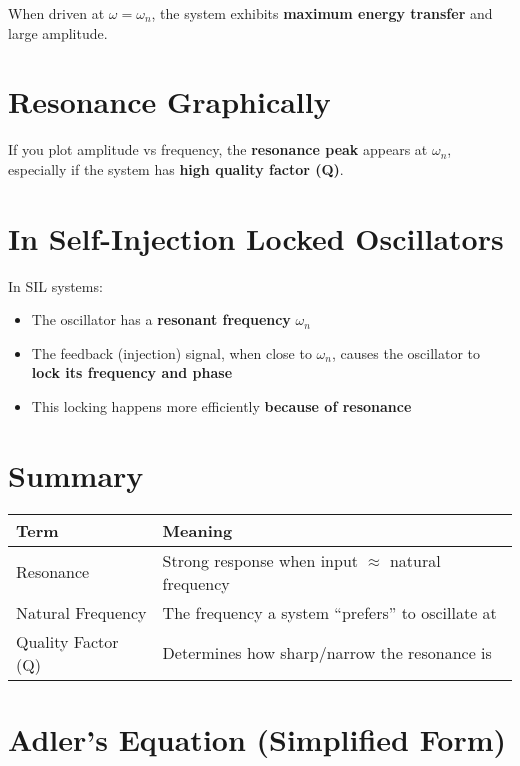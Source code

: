 \documentclass{article}
\begin{document}
When driven at $\omega = \omega_n$, the system exhibits \textbf{maximum energy transfer} and large amplitude.

\section{Resonance Graphically}

If you plot amplitude vs frequency, the \textbf{resonance peak} appears at $\omega_n$, especially if the system has \textbf{high quality factor (Q)}.

\section{In Self-Injection Locked Oscillators}

In SIL systems:
\begin{itemize}
    \item The oscillator has a \textbf{resonant frequency} $\omega_n$
    \item The feedback (injection) signal, when close to $\omega_n$, causes the oscillator to \textbf{lock its frequency and phase}
    \item This locking happens more efficiently \textbf{because of resonance}
\end{itemize}

\section{Summary}

\begin{center}
\begin{tabular}{>{\centering\arraybackslash}m{4cm} >{\raggedright\arraybackslash}m{8cm}}
\toprule
\textbf{Term} & \textbf{Meaning} \\
\midrule
Resonance & Strong response when input $\approx$ natural frequency \\
Natural Frequency & The frequency a system ``prefers'' to oscillate at \\
Quality Factor (Q) & Determines how sharp/narrow the resonance is \\
\bottomrule
\end{tabular}
\end{center}

\section{Adler's Equation (Simplified Form)}
    
\end{document}
